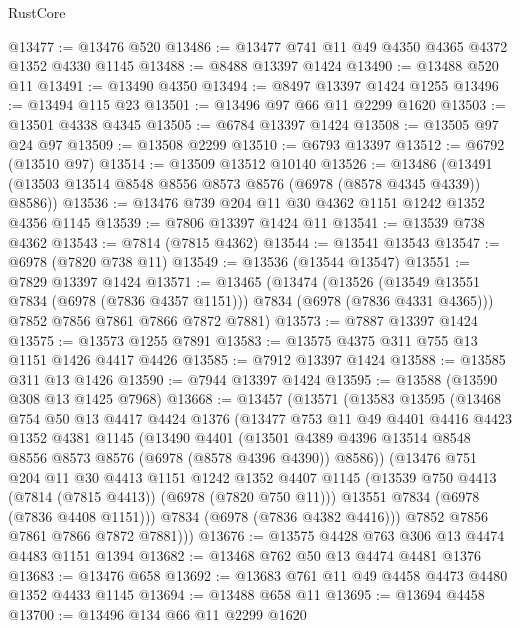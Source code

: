 \begin{lexlean}{RustCore}
\begin{coremodule}
@13477 := @13476 @520
@13486 := @13477 @741 @11 @49 @4350 @4365 @4372 @1352 @4330 @1145
@13488 := @8488 @13397 @1424
@13490 := @13488 @520 @11
@13491 := @13490 @4350
@13494 := @8497 @13397 @1424 @1255
@13496 := @13494 @115 @23
@13501 := @13496 @97 @66 @11 @2299 @1620
@13503 := @13501 @4338 @4345
@13505 := @6784 @13397 @1424
@13508 := @13505 @97 @24 @97
@13509 := @13508 @2299
@13510 := @6793 @13397
@13512 := @6792 (@13510 @97)
@13514 := @13509 @13512 @10140
@13526 := @13486 (@13491 (@13503 @13514 @8548 @8556 @8573 @8576 (@6978 (@8578 @4345 @4339)) @8586))
@13536 := @13476 @739 @204 @11 @30 @4362 @1151 @1242 @1352 @4356 @1145
@13539 := @7806 @13397 @1424 @11
@13541 := @13539 @738 @4362
@13543 := @7814 (@7815 @4362)
@13544 := @13541 @13543
@13547 := @6978 (@7820 @738 @11)
@13549 := @13536 (@13544 @13547)
@13551 := @7829 @13397 @1424
@13571 := @13465
    (@13474
      (@13526 (@13549 @13551 @7834 (@6978 (@7836 @4357 @1151))) @7834 (@6978 (@7836 @4331 @4365)))
      @7852
      @7856
      @7861
      @7866
      @7872
      @7881)
@13573 := @7887 @13397 @1424
@13575 := @13573 @1255 @7891
@13583 := @13575 @4375 @311 @755 @13 @1151 @1426 @4417 @4426
@13585 := @7912 @13397 @1424
@13588 := @13585 @311 @13 @1426
@13590 := @7944 @13397 @1424
@13595 := @13588 (@13590 @308 @13 @1425 @7968)
@13668 := @13457
    (@13571
      (@13583
        @13595
        (@13468
          @754
          @50
          @13
          @4417
          @4424
          @1376
          (@13477
            @753
            @11
            @49
            @4401
            @4416
            @4423
            @1352
            @4381
            @1145
            (@13490
              @4401
              (@13501 @4389 @4396 @13514 @8548 @8556 @8573 @8576 (@6978 (@8578 @4396 @4390)) @8586))
            (@13476
              @751
              @204
              @11
              @30
              @4413
              @1151
              @1242
              @1352
              @4407
              @1145
              (@13539 @750 @4413 (@7814 (@7815 @4413)) (@6978 (@7820 @750 @11)))
              @13551
              @7834
              (@6978 (@7836 @4408 @1151)))
            @7834
            (@6978 (@7836 @4382 @4416)))
          @7852
          @7856
          @7861
          @7866
          @7872
          @7881)))
@13676 := @13575 @4428 @763 @306 @13 @4474 @4483 @1151 @1394
@13682 := @13468 @762 @50 @13 @4474 @4481 @1376
@13683 := @13476 @658
@13692 := @13683 @761 @11 @49 @4458 @4473 @4480 @1352 @4433 @1145
@13694 := @13488 @658 @11
@13695 := @13694 @4458
@13700 := @13496 @134 @66 @11 @2299 @1620

\end{coremodule}
\end{lexlean}

